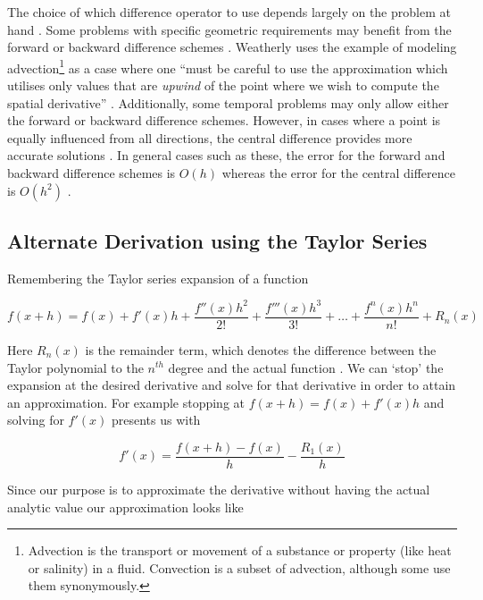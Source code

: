\documentclass[authoryearcitations]{UoYCSproject}
\begin{document}
The choice of which difference operator to use depends largely on the problem at hand \cite{Hamming, weatherley}. 
Some problems with specific geometric requirements may benefit from the forward or backward difference schemes \cite{weatherley}.
Weatherly uses the example of modeling advection\footnote{Advection is the transport or movement of a substance or property
(like heat or salinity) in a fluid. Convection is a subset of advection, although some use them synonymously.} as a case
where one ``must be careful to use the approximation which utilises only values that are \emph{upwind} of the point where
we wish to compute the spatial derivative'' \cite{weatherley4}. Additionally, some temporal problems may only allow
either the forward or backward difference schemes. However, in cases where a point is equally influenced
from all directions, the central difference provides more accurate solutions \cite{Hamming, weatherley, weatherley4, analysis}.
In general cases such as these, the error for the forward and backward difference schemes is $O(h)$ whereas the error 
for the central difference is $O(h^2)$ \cite{analysis, weatherley}. 

\subsection{Alternate Derivation using the Taylor Series}

Remembering the Taylor series expansion of a function

\begin{equation}
\label{eq:taylor}
f(x + h) = f(x) + f'(x)h+ \frac{f''(x)h^2}{2!} + \frac{f'''(x)h^3}{3!} + \dots + \frac{f^n(x)h^n}{n!} + R_{n}(x)
\end{equation}

Here $R_{n}(x)$ is the remainder term, which denotes the difference between the Taylor polynomial to the $n^{th}$ degree
and the actual function \cite{analysis}. 
We can `stop' the expansion at the desired derivative and solve for that derivative in order to attain an approximation. 
For example stopping at $f(x + h) = f(x) + f'(x)h$ and solving for $f'(x)$ presents us with

\begin{equation}
f'(x) = \frac{f(x + h) - f(x)}{h} - \frac{R_{1}(x)}{h}
\label{eq:taylorForward}
\end{equation}

Since our purpose is to approximate the derivative without having the actual analytic value our approximation looks like
\end{document}
